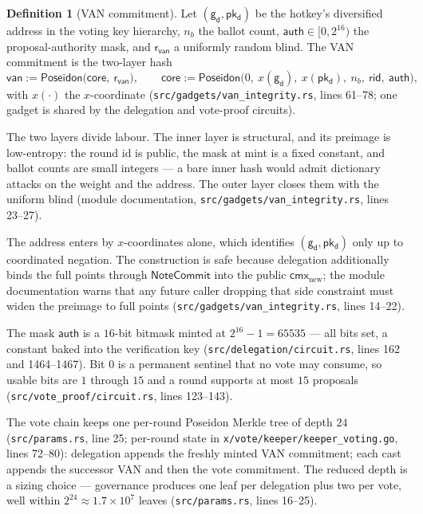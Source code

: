 \documentclass[11pt,a4paper]{article}
\theoremstyle{definition}
\newtheorem{definition}[theorem]{Definition}
\newcommand{\cmx}{\mathsf{cmx}}
\newcommand{\NoteCommit}{\ensuremath{\mathsf{NoteCommit}}}
\newcommand{\pkd}{\ensuremath{\mathsf{pk_d}}}
\newcommand{\gd}{\ensuremath{\mathsf{g_d}}}
\begin{document}
\begin{definition}[VAN commitment]\label{def:vote-van}
Let $(\gd, \pkd)$ be the hotkey's diversified address in the voting key
hierarchy, $n_b$ the ballot count, $\mathsf{auth} \in [0, 2^{16})$ the
proposal-authority mask, and $\mathsf{r}_{\mathsf{van}}$ a uniformly random
blind. The VAN commitment is the two-layer hash
\[
\mathsf{van} := \mathsf{Poseidon}\bigl(\mathsf{core},\
\mathsf{r}_{\mathsf{van}}\bigr), \qquad
\mathsf{core} := \mathsf{Poseidon}\bigl(0,\ x(\gd),\ x(\pkd),\ n_b,\
\mathsf{rid},\ \mathsf{auth}\bigr),
\]
with $x(\cdot)$ the $x$-coordinate
(\texttt{src/gadgets/van\_integrity.rs}, lines 61--78; one gadget is shared
by the delegation and vote-proof circuits).
\end{definition}

The two layers divide labour. The inner layer is structural, and its preimage
is low-entropy: the round id is public, the mask at mint is a fixed constant,
and ballot counts are small integers --- a bare inner hash would admit
dictionary attacks on the weight and the address. The outer layer closes them
with the uniform blind (module documentation,
\texttt{src/gadgets/van\_integrity.rs}, lines 23--27).

The address enters by $x$-coordinates alone, which identifies
$(\gd, \pkd)$ only up to coordinated negation. The construction is safe
because delegation additionally binds the full points through \NoteCommit{}
into the public $\cmx_{\mathrm{new}}$; the module documentation warns that
any future caller dropping that side constraint must widen the preimage to
full points (\texttt{src/gadgets/van\_integrity.rs}, lines 14--22).

The mask $\mathsf{auth}$ is a $16$-bit bitmask minted at
$2^{16} - 1 = 65535$ --- all bits set, a constant baked into the verification
key (\texttt{src/delegation/circuit.rs}, lines 162 and 1464--1467). Bit $0$
is a
permanent sentinel that no vote may consume, so usable bits are $1$ through
$15$ and a round supports at most $15$ proposals
(\texttt{src/vote\_proof/circuit.rs}, lines 123--143).

The vote chain keeps one per-round Poseidon Merkle tree of depth $24$
(\texttt{src/params.rs}, line 25; per-round state in
\texttt{x/vote/keeper/keeper\_voting.go}, lines 72--80): delegation appends
the freshly minted VAN commitment; each cast appends the successor VAN and
then the vote commitment. The reduced depth is a sizing choice ---
governance produces one leaf per delegation plus two per vote, well within
$2^{24} \approx 1.7 \times 10^{7}$ leaves (\texttt{src/params.rs}, lines
16--25).
\end{document}
